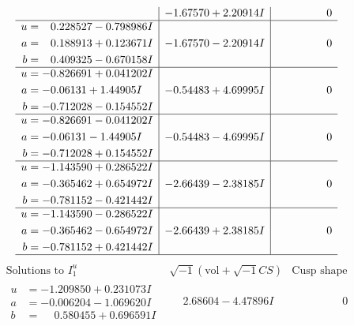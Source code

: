 \documentclass[1p]{elsarticle_modified}
\theoremstyle{definition}
\newcommand{\I}{\sqrt{-1}}
\begin{document}
$$\begin{array}{c|c|c}
 & -1.67570 + 2.20914 I & \phantom{-0.000000 } 0 \\ \hline\begin{aligned}
u &= \phantom{-}0.228527 - 0.798986 I \\
a &= \phantom{-}0.188913 + 0.123671 I \\
b &= \phantom{-}0.409325 - 0.670158 I\end{aligned}
 & -1.67570 - 2.20914 I & \phantom{-0.000000 } 0 \\ \hline\begin{aligned}
u &= -0.826691 + 0.041202 I \\
a &= -0.06131 + 1.44905 I \\
b &= -0.712028 - 0.154552 I\end{aligned}
 & -0.54483 + 4.69995 I & \phantom{-0.000000 } 0 \\ \hline\begin{aligned}
u &= -0.826691 - 0.041202 I \\
a &= -0.06131 - 1.44905 I \\
b &= -0.712028 + 0.154552 I\end{aligned}
 & -0.54483 - 4.69995 I & \phantom{-0.000000 } 0 \\ \hline\begin{aligned}
u &= -1.143590 + 0.286522 I \\
a &= -0.365462 + 0.654972 I \\
b &= -0.781152 - 0.421442 I\end{aligned}
 & -2.66439 - 2.38185 I & \phantom{-0.000000 } 0 \\ \hline\begin{aligned}
u &= -1.143590 - 0.286522 I \\
a &= -0.365462 - 0.654972 I \\
b &= -0.781152 + 0.421442 I\end{aligned}
 & -2.66439 + 2.38185 I & \phantom{-0.000000 } 0\\
 \hline 
 \end{array}$$\newpage$$\begin{array}{c|c|c}  
\text{Solutions to }I^u_{1}& \I (\text{vol} + \sqrt{-1}CS) & \text{Cusp shape}\\
 \hline 
\begin{aligned}
u &= -1.209850 + 0.231073 I \\
a &= -0.006204 - 1.069620 I \\
b &= \phantom{-}0.580455 + 0.696591 I\end{aligned}
 & \phantom{-}2.68604 - 4.47896 I & \phantom{-0.000000 } 0 \\ \hline\begin{aligned}

\end{aligned}
\end{array}$$
\end{document}
